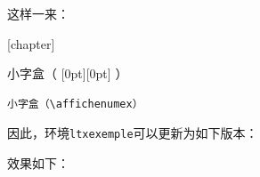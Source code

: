 这样一来：

[chapter]
\renewcommand{\thecexemple}{%
\thechapter.\arabic{cexemple}}
\setcounter{cexemple}{34}

\newcommand{\affichenumex}{%
\raisebox{-1.7pt}[0pt][0pt]{%
\setlength{\fboxsep}{.7pt}%
\colorbox{black}{%
\makebox[16pt]{%
\color{white}%
\tiny\textsf{\thecexemple}}}}}

\begin{codelist}[11.34]{
小字盒（\affichenumex）
}
\begin{verbatim}
小字盒（\affichenumex）\end{verbatim}
\end{codelist}

因此，环境\verb|ltxexemple|可以更新为如下版本：


效果如下：

\makeatletter
\newenvironment{ltxexempleiii}{%
  \setlength{\fboxsep}{.5pt}%
  \VerbatimEnvironment%
  \begin{VerbatimOut}[gobble=2]{\jobname.exa}}{%
  \end{VerbatimOut}%
  \begin{ltxexempleenv}%
    \refstepcounter{cexemple}
    \savebox{\b@iteentree}{%
      \begin{boxedminipage}{\ltxexinputwidthratio\linewidth}
        \VerbatimInput{\jobname.exa}
      \end{boxedminipage}}%
    \savebox{\b@itesortie}{%
      \begin{boxedminipage}{\ltxexoutputwidthratio\linewidth} 
        \setlength{\parindent}{10pt}%
        
      \end{boxedminipage}}%
    \usebox{\b@iteentree}%
    \kern2pt%
    \parbox{3pt}{\rotatebox{90}{\affichenumex}}%
    \kern2pt%
    \usebox{\b@itesortie}
  \end{ltxexempleenv}}%
\makeatother%


